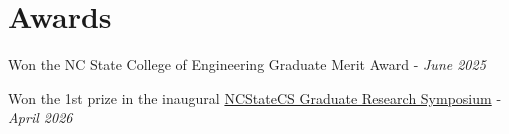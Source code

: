 \section{Awards}

\begin{onecolentry}
    \begin{highlights}
        \item Won the NC State College of Engineering Graduate Merit Award - \textit{June 2025}
        \item Won the 1st prize in the inaugural \href{https://www.linkedin.com/posts/ncstatecs_ncstatecs-programyourpath-gradpack-activity-7449571785240375296-M01q?utm_source=share&utm_medium=member_desktop&rcm=ACoAACH7TKgBi21tXmBnW0hq50W-ghhBKogjcVM}{NCStateCS Graduate Research Symposium} - \textit{April 2026}
    \end{highlights}
\end{onecolentry}